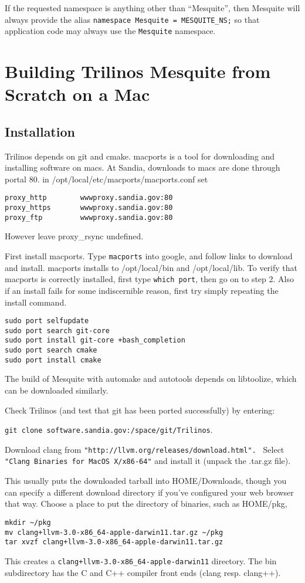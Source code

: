 If the requested namespace is anything other than ``Mesquite'', then Mesquite will always provide the alias \texttt{namespace Mesquite = MESQUITE\_NS;} so that application code may always use the \texttt{Mesquite} namespace.

\section{Building Trilinos Mesquite from Scratch on a Mac}
\subsection{Installation}

Trilinos depends on git and cmake.
macports is a tool for downloading and installing software on macs.
At Sandia, downloads to macs are done through portal 80.
in /opt/local/etc/macports/macports.conf set 
\begin{verbatim}
proxy_http        wwwproxy.sandia.gov:80
proxy_https       wwwproxy.sandia.gov:80
proxy_ftp         wwwproxy.sandia.gov:80
\end{verbatim}
However leave proxy\_rsync undefined.


First install macports.  Type {\tt macports} into google, and follow links to download and install.
macports  installs to /opt/local/bin  and /opt/local/lib.
To verify that macports is correctly installed,  first  type {\tt which port},  then go on to step 2.
Also if an install fails for some indiscernible reason, 
first try simply repeating the install command.

\begin{verbatim}
sudo port selfupdate   
sudo port search git-core
sudo port install git-core +bash_completion
sudo port search cmake
sudo port install cmake   
\end{verbatim}
The build of Mesquite with automake and autotools depends on  libtoolize, which can be downloaded similarly.

Check Trilinos (and test that git has been ported successfully) by entering:

\begin{center}
 {\tt git clone software.sandia.gov:/space/git/Trilinos}.
\end{center}

Download clang from {\tt "http://llvm.org/releases/download.html". } Select {\tt "Clang Binaries for MacOS X/x86-64"} and install it (unpack the .tar.gz file).

This usually puts the downloaded tarball into HOME/Downloads, though you can specify a different download directory if you've configured your web browser that way.  Choose a place to put the directory of binaries, such as  HOME/pkg,
\begin{verbatim}
mkdir ~/pkg
mv clang+llvm-3.0-x86_64-apple-darwin11.tar.gz ~/pkg
tar xvzf clang+llvm-3.0-x86_64-apple-darwin11.tar.gz
\end{verbatim}
This creates a {\tt clang+llvm-3.0-x86\_64-apple-darwin11} directory.  
The bin subdirectory has the C and C++ compiler front ends (clang resp. clang++).
